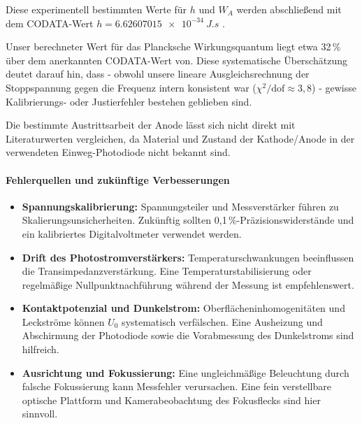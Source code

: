 Diese experimentell bestimmten Werte für $h$ und $W_{A}$ werden abschließend mit dem CODATA-Wert $h=\SI{6.626 070 15e-34}{J.s}$ \cite{codata}.


Unser berechneter Wert für das Plancksche Wirkungsquantum liegt etwa 32\,\% über dem anerkannten CODATA-Wert von. Diese systematische Überschätzung deutet darauf hin, dass - obwohl unsere lineare Ausgleichsrechnung der Stoppspannung gegen die Frequenz intern konsistent war (\(\chi^2/\mathrm{dof}\approx3{,}8\)) - gewisse Kalibrierungs- oder Justierfehler bestehen geblieben sind.

Die bestimm­te Austrittsarbeit der Anode lässt sich nicht direkt mit Literaturwerten vergleichen, da Material
und Zustand der Kathode/Anode in der verwendeten Einweg-Photodiode nicht
bekannt sind.

\paragraph{Fehlerquellen und zukünftige Verbesserungen}

\begin{itemize}
  \item \textbf{Spannungskalibrierung:} Spannungsteiler und Messverstärker führen zu
    Skalierungsunsicherheiten. Zukünftig sollten 0{,}1\,\%-Präzisionswiderstände
    und ein kalibriertes Digitalvoltmeter verwendet werden.

  \item \textbf{Drift des Photostromverstärkers:} Temperaturschwankungen beeinflussen
    die Transimpedanzverstärkung. Eine Temperaturstabilisierung oder regelmäßige
    Nullpunktnachführung während der Messung ist empfehlenswert.

  \item \textbf{Kontaktpotenzial und Dunkelstrom:} Oberflächeninhomogenitäten und
    Leckströme können \(U_0\) systematisch verfälschen. Eine Ausheizung und
    Abschirmung der Photodiode sowie die Vorabmessung des Dunkelstroms sind
    hilfreich.

  \item \textbf{Ausrichtung und Fokussierung:} Eine ungleichmäßige Beleuchtung durch
    falsche Fokussierung kann Messfehler verursachen. Eine fein verstellbare
    optische Plattform und Kamerabeobachtung des Fokusflecks sind hier sinnvoll.
\end{itemize}
